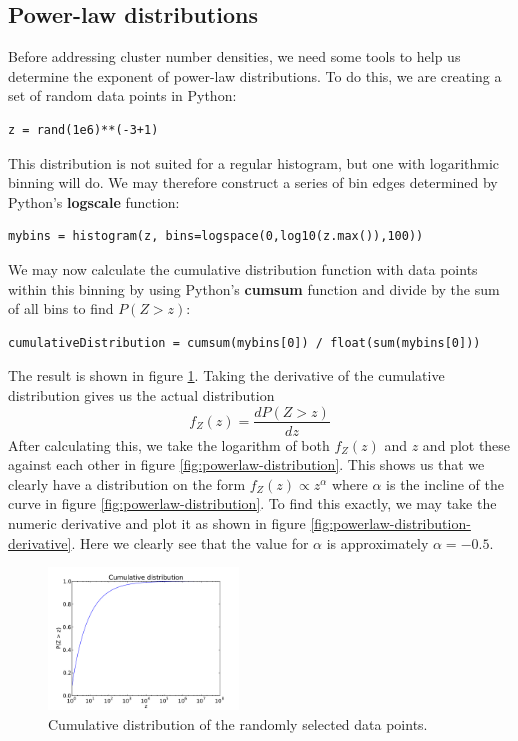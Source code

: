 \documentclass[a4paper,reprint,floatfix,amsmath,amssymb,aps,pra]{revtex4-1}
\begin{document}
\subsection{Power-law distributions}

Before addressing cluster number densities, we need some tools to help us determine the exponent of power-law distributions. To do this, we are creating a set of random data points in Python:
\begin{lstlisting}
z = rand(1e6)**(-3+1)
\end{lstlisting}
This distribution is not suited for a regular histogram, but one with logarithmic binning will do. We may therefore construct a series of bin edges determined by Python's \textbf{logscale} function:
\begin{lstlisting}
mybins = histogram(z, bins=logspace(0,log10(z.max()),100))
\end{lstlisting}
We may now calculate the cumulative distribution function with data points within this binning by using Python's \textbf{cumsum} function and divide by the sum of all bins to find $P(Z > z)$:
\begin{lstlisting}
cumulativeDistribution = cumsum(mybins[0]) / float(sum(mybins[0]))
\end{lstlisting}
The result is shown in figure \ref{fig:powerlaw-cumulative-distribution}. Taking the derivative of the cumulative distribution gives us the actual distribution
\begin{equation}
  f_{Z}(z) = \frac{dP(Z > z)}{dz}
\end{equation} 
After calculating this, we take the logarithm of both $f_{Z}(z)$ and $z$ and plot these against each other in figure \ref{fig:powerlaw-distribution}. This shows us that we clearly have a distribution on the form $f_{Z}(z) \propto z^{\alpha}$ where $\alpha$ is the incline of the curve in figure \ref{fig:powerlaw-distribution}. To find this exactly, we may take the numeric derivative and plot it as shown in figure \ref{fig:powerlaw-distribution-derivative}. Here we clearly see that the value for $\alpha$ is approximately $\alpha = -0.5$.
\begin{figure}
  \centering
  \includegraphics[width=0.45\textwidth]{../percolation/results/1c/cumulative-distribution.pdf}
  \caption{Cumulative distribution of the randomly selected data points.}
  \label{fig:powerlaw-cumulative-distribution}
\end{figure}
\end{document}
